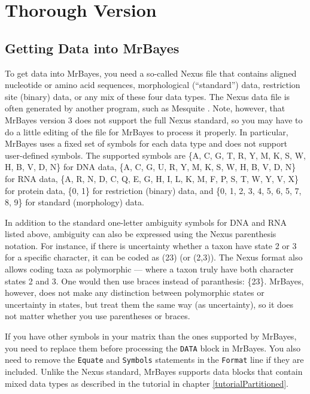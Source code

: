 \documentclass[12pt]{book}
\newcommand{\ttt}[1]{\texttt{#1}}
\begin{document}
\section{Thorough Version}

\subsection{Getting Data into MrBayes}

To get data into MrBayes, you need a so-called Nexus file that contains aligned nucleotide or amino
acid sequences, morphological (``standard'') data, restriction site (binary) data, or any mix of
these four data types. The Nexus data file is often generated by another program, such as Mesquite
\citep{maddison06}. Note, however, that MrBayes version 3 does not support the full Nexus standard,
so you may have to do a little editing of the file for MrBayes to process it properly. In
particular, MrBayes uses a fixed set of symbols for each data type and does not support
user-defined symbols. The supported symbols are \{A, C, G, T, R, Y, M, K, S, W, H, B, V, D, N\} for
DNA data, \{A, C, G, U, R, Y, M, K, S, W, H, B, V, D, N\} for RNA data, \{A, R, N, D, C, Q, E, G,
H, I, L, K, M, F, P, S, T, W, Y, V, X\} for protein data, \{0, 1\} for restriction (binary) data,
and \{0, 1, 2, 3, 4, 5, 6, 5, 7, 8, 9\} for standard (morphology) data.

In addition to the standard one-letter ambiguity symbols for DNA and RNA listed above, ambiguity
can also be expressed using the Nexus parenthesis notation. For instance, if there is uncertainty
whether a taxon have state 2 or 3 for a specific character, it can be coded as (23) (or (2,3)).
The Nexus format also allows coding taxa as polymorphic --- where a taxon truly have both character
states 2 and 3. One would then use braces instead of paranthesis: \{23\}. MrBayes, however, does
not make any distinction between polymorphic states or uncertainty in states, but treat them the
same way (as uncertainty), so it does not matter whether you use parentheses or braces.

If you have other symbols in your matrix than the ones supported by MrBayes, you need to replace
them before processing the \ttt{DATA} block in MrBayes. You also need to remove the \ttt{Equate}
and \ttt{Symbols} statements in the \ttt{Format} line if they are included. Unlike the Nexus
standard, MrBayes supports data blocks that contain mixed data types as described in the tutorial
in chapter \ref{tutorialPartitioned}.
\end{document}
